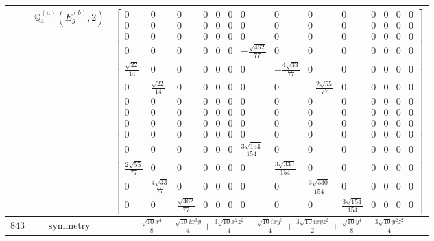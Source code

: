 \documentclass[fleqn,8pt,landscape]{jsarticle}
\begin{document}
\begin{longtable}{ccc}
$  $ & $ \mathbb{Q}_{4}^{(a)}(E_{g}^{(b)},2) $ & $ \begin{bmatrix} 0 & 0 & 0 & 0 & 0 & 0 & 0 & 0 & 0 & 0 & 0 & 0 & 0 & 0 \\ 0 & 0 & 0 & 0 & 0 & 0 & 0 & 0 & 0 & 0 & 0 & 0 & 0 & 0 \\ 0 & 0 & 0 & 0 & 0 & 0 & 0 & 0 & 0 & 0 & 0 & 0 & 0 & 0 \\ 0 & 0 & 0 & 0 & 0 & 0 & - \frac{\sqrt{462}}{77} & 0 & 0 & 0 & 0 & 0 & 0 & 0 \\ \frac{\sqrt{22}}{14} & 0 & 0 & 0 & 0 & 0 & 0 & - \frac{4 \sqrt{33}}{77} & 0 & 0 & 0 & 0 & 0 & 0 \\ 0 & \frac{\sqrt{22}}{14} & 0 & 0 & 0 & 0 & 0 & 0 & - \frac{2 \sqrt{55}}{77} & 0 & 0 & 0 & 0 & 0 \\ 0 & 0 & 0 & 0 & 0 & 0 & 0 & 0 & 0 & 0 & 0 & 0 & 0 & 0 \\ 0 & 0 & 0 & 0 & 0 & 0 & 0 & 0 & 0 & 0 & 0 & 0 & 0 & 0 \\ 0 & 0 & 0 & 0 & 0 & 0 & 0 & 0 & 0 & 0 & 0 & 0 & 0 & 0 \\ 0 & 0 & 0 & 0 & 0 & 0 & 0 & 0 & 0 & 0 & 0 & 0 & 0 & 0 \\ 0 & 0 & 0 & 0 & 0 & 0 & \frac{3 \sqrt{154}}{154} & 0 & 0 & 0 & 0 & 0 & 0 & 0 \\ \frac{2 \sqrt{55}}{77} & 0 & 0 & 0 & 0 & 0 & 0 & \frac{3 \sqrt{330}}{154} & 0 & 0 & 0 & 0 & 0 & 0 \\ 0 & \frac{4 \sqrt{33}}{77} & 0 & 0 & 0 & 0 & 0 & 0 & \frac{3 \sqrt{330}}{154} & 0 & 0 & 0 & 0 & 0 \\ 0 & 0 & \frac{\sqrt{462}}{77} & 0 & 0 & 0 & 0 & 0 & 0 & \frac{3 \sqrt{154}}{154} & 0 & 0 & 0 & 0 \end{bmatrix} $ \\ \hline
$ 843 $ & $ \text{symmetry} $ & $ - \frac{\sqrt{10} x^{4}}{8} - \frac{\sqrt{10} i x^{3} y}{4} + \frac{3 \sqrt{10} x^{2} z^{2}}{4} - \frac{\sqrt{10} i x y^{3}}{4} + \frac{3 \sqrt{10} i x y z^{2}}{2} + \frac{\sqrt{10} y^{4}}{8} - \frac{3 \sqrt{10} y^{2} z^{2}}{4} $ \\

\end{longtable}
\end{document}
